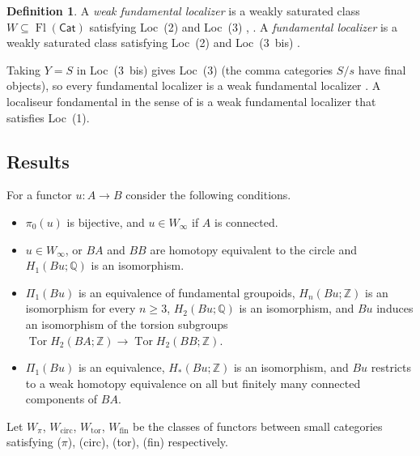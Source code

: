 \documentclass[11pt,a4paper]{article}
\theoremstyle{definition}
\newtheorem{definition}[theorem]{Definition}
\newcommand{\Cat}{\mathsf{Cat}}
\newcommand{\Fl}{\operatorname{Fl}}
\newcommand{\Winf}{W_{\infty}}
\newcommand{\Wpi}{W_{\pi}}
\newcommand{\Wcirc}{W_{\mathrm{circ}}}
\newcommand{\Wtor}{W_{\mathrm{tor}}}
\newcommand{\Wfin}{W_{\mathrm{fin}}}
\newcommand{\Tor}{\operatorname{Tor}}
\newcommand{\Z}{\mathbb{Z}}
\newcommand{\Q}{\mathbb{Q}}
\newcommand{\Pione}{\Pi_1}
\begin{document}
\begin{definition}\label{def:localizers}
A \emph{weak fundamental localizer} is a weakly saturated class $W\subseteq\Fl(\Cat)$
satisfying Loc~(2) and Loc~(3) \cite[1.1.2]{Mal05}, \cite[6.1.12]{Cis06}. A
\emph{fundamental localizer} is a weakly saturated class satisfying Loc~(2) and Loc~(3~bis)
\cite[D\'ef.~3.3.2]{Cis06}.
\end{definition}

Taking $Y=S$ in Loc~(3~bis) gives Loc~(3) (the comma categories $S/s$ have final objects), so
every fundamental localizer is a weak fundamental localizer \cite[6.1.12]{Cis06}. A localiseur
fondamental in the sense of \cite[XVI, D\'ef.~1.1]{Der} is a weak fundamental localizer that
satisfies Loc~(1).

\subsection{Results}\label{subsec:results}

For a functor $u\colon A\to B$ consider the following conditions.
\begin{itemize}[leftmargin=3.6em,labelwidth=3.1em,labelsep=0.5em,align=left]
\item[($\pi$)] $\pi_0(u)$ is bijective, and $u\in\Winf$ if $A$ is connected.
\item[(circ)] $u\in\Winf$, or $BA$ and $BB$ are homotopy equivalent to the circle and
$H_1(Bu;\Q)$ is an isomorphism.
\item[(tor)] $\Pione(Bu)$ is an equivalence of fundamental groupoids, $H_n(Bu;\Z)$ is an
isomorphism for every $n\ge3$, $H_2(Bu;\Q)$ is an isomorphism, and $Bu$ induces an
isomorphism of the torsion subgroups $\Tor H_2(BA;\Z)\to\Tor H_2(BB;\Z)$.
\item[(fin)] $\Pione(Bu)$ is an equivalence, $H_*(Bu;\Z)$ is an isomorphism, and $Bu$
restricts to a weak homotopy equivalence on all but finitely many connected components of
$BA$.
\end{itemize}
Let $\Wpi$, $\Wcirc$, $\Wtor$, $\Wfin$ be the classes of functors between small categories
satisfying ($\pi$), (circ), (tor), (fin) respectively.
\end{document}
